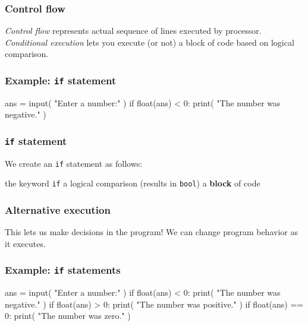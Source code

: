 \documentclass[11pt]{beamer}
\begin{document}
\begin{frame}[fragile]
  \frametitle{Control flow}
  \Enlarge

  \begin{itemize}
  \myitem  \emph{Control flow} represents actual sequence of lines executed by processor. \pause
  \myitem  \emph{Conditional execution} lets you execute (or not) a block of code based on logical comparison.
  \end{itemize}
\end{frame}

\begin{frame}[fragile]
  \frametitle{Example:  \texttt{if} statement}
  \Enlarge

  \begin{semiverbatim}
ans = input( "Enter a number:" )
if float(ans) < 0:
    print( "The number was negative." )
  \end{semiverbatim}
\end{frame}

\begin{frame}[fragile]
  \frametitle{\texttt{if} statement}
  \Enlarge

  \begin{itemize}
  \myitem  We create an \texttt{if} statement as follows:
    \begin{itemize}
    \mysubitem  the keyword \texttt{if}
    \mysubitem  a logical comparison (results in \texttt{bool})
    \mysubitem  a \textbf{block} of code
    \end{itemize}
  \end{itemize}
\end{frame}

\begin{frame}[fragile]
  \frametitle{Alternative execution}
  \Enlarge

  \begin{itemize}
  \myitem  This lets us make decisions in the program! \pause
  \myitem  We can change program behavior as it executes.
  \end{itemize}
\end{frame}

\begin{frame}[fragile]
  \frametitle{Example:  \texttt{if} statements}
  \Enlarge

  \begin{semiverbatim}
ans = input( "Enter a number:" )
if float(ans) < 0:
    print( "The number was negative." )
if float(ans) > 0:
    print( "The number was positive." )
if float(ans) == 0:
    print( "The number was zero." )
  \end{semiverbatim}
\end{frame}
\end{document}

